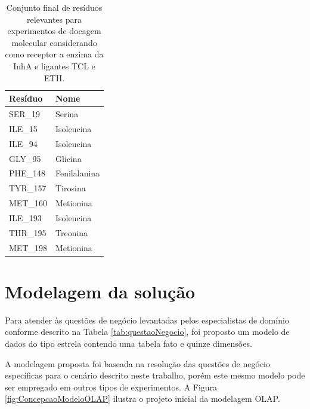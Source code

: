 \begin{table}[h]
\caption{Conjunto final de resíduos relevantes para experimentos de docagem molecular considerando como receptor a enzima da InhA e ligantes TCL e ETH.}
\label{tab:listaProvavelRelevantes}
\centering
\begin{tabular}{@{}ll@{}}
\toprule
\textbf{Resíduo} 		    & \textbf{Nome} 		 \\ \midrule
SER\_19                     & Serina                   \\
ILE\_15                     & Isoleucina               \\
ILE\_94                     & Isoleucina               \\
GLY\_95                     & Glicina                  \\
PHE\_148                    & Fenilalanina             \\
TYR\_157                    & Tirosina                 \\
MET\_160                    & Metionina                \\
ILE\_193                    & Isoleucina               \\
THR\_195                    & Treonina                 \\
MET\_198                    & Metionina                \\ \bottomrule
\end{tabular}
\end{table}

\section{Modelagem da solução}
\label{sec:ModelagemDaSolucao}

Para atender às questões de negócio levantadas pelos especialistas de domínio conforme descrito na Tabela \ref{tab:questaoNegocio}, foi proposto um modelo de dados do tipo estrela contendo uma tabela fato e quinze dimensões. 

A modelagem proposta foi baseada na resolução das questões de negócio específicas para o cenário descrito neste trabalho, porém este mesmo modelo pode ser empregado em outros tipos de experimentos. A Figura \ref{fig:ConcepcaoModeloOLAP} ilustra o projeto inicial da modelagem OLAP.

